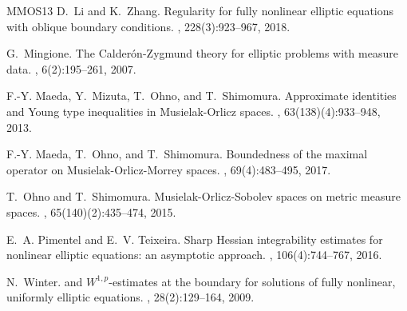\documentclass[11pt, reqno]{amsart}
\numberwithin{equation}{section}
\begin{document}
\begin{thebibliography}{MMOS13}
D.~Li and K.~Zhang.
\newblock Regularity for fully nonlinear elliptic equations with oblique
  boundary conditions.
, 228(3):923--967, 2018.

G.~Mingione.
\newblock The {C}alder\'{o}n-{Z}ygmund theory for elliptic problems with
  measure data.
, 6(2):195--261, 2007.

F.-Y. Maeda, Y.~Mizuta, T.~Ohno, and T.~Shimomura.
\newblock Approximate identities and {Y}oung type inequalities in
  {M}usielak-{O}rlicz spaces.
, 63(138)(4):933--948, 2013.

F.-Y. Maeda, T.~Ohno, and T.~Shimomura.
\newblock Boundedness of the maximal operator on {M}usielak-{O}rlicz-{M}orrey
  spaces.
, 69(4):483--495, 2017.

T.~Ohno and T.~Shimomura.
\newblock Musielak-{O}rlicz-{S}obolev spaces on metric measure spaces.
, 65(140)(2):435--474, 2015.

E.~A. Pimentel and E.~V. Teixeira.
\newblock Sharp {H}essian integrability estimates for nonlinear elliptic
  equations: an asymptotic approach.
, 106(4):744--767, 2016.

N.~Winter.
 and {$W^{1,p}$}-estimates at the boundary for solutions
  of fully nonlinear, uniformly elliptic equations.
, 28(2):129--164, 2009.

\end{thebibliography}
\end{document}
